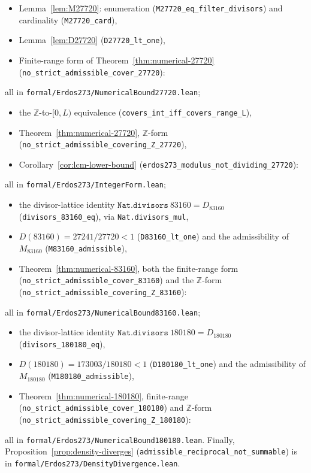 \documentclass[11pt,a4paper]{article}
\theoremstyle{plain}
\theoremstyle{definition}
\theoremstyle{remark}
\begin{document}
\begin{sloppypar}
\begin{itemize}
  \item Lemma~\ref{lem:M27720}: enumeration
        (\texttt{M27720\_eq\_filter\_divisors}) and
        cardinality (\texttt{M27720\_card}),
  \item Lemma~\ref{lem:D27720}
        (\texttt{D27720\_lt\_one}),
  \item Finite-range form of Theorem~\ref{thm:numerical-27720}
        (\texttt{no\_strict\_admissible\_cover\_27720}):
\end{itemize}
all in \texttt{formal/Erdos273/NumericalBound27720.lean};
\begin{itemize}
  \item the $\mathbb{Z}$-to-$[0, L)$ equivalence
        (\texttt{covers\_int\_iff\_covers\_range\_L}),
  \item Theorem~\ref{thm:numerical-27720}, $\mathbb{Z}$-form
        (\texttt{no\_strict\_admissible\_covering\_Z\_27720}),
  \item Corollary~\ref{cor:lcm-lower-bound}
        (\texttt{erdos273\_modulus\_not\_dividing\_27720}):
\end{itemize}
all in \texttt{formal/Erdos273/IntegerForm.lean};
\begin{itemize}
  \item the divisor-lattice identity
        $\texttt{Nat.divisors}\ 83160 = D_{83160}$
        (\texttt{divisors\_83160\_eq}), via \texttt{Nat.divisors\_mul},
  \item $D(83160) = 27241/27720 < 1$ (\texttt{D83160\_lt\_one}) and the
        admissibility of $M_{83160}$ (\texttt{M83160\_admissible}),
  \item Theorem~\ref{thm:numerical-83160}, both the finite-range form
        (\texttt{no\_strict\_admissible\_cover\_83160}) and the
        $\mathbb{Z}$-form
        (\texttt{no\_strict\_admissible\_covering\_Z\_83160}):
\end{itemize}
all in \texttt{formal/Erdos273/NumericalBound83160.lean};
\begin{itemize}
  \item the divisor-lattice identity
        $\texttt{Nat.divisors}\ 180180 = D_{180180}$
        (\texttt{divisors\_180180\_eq}),
  \item $D(180180) = 173003/180180 < 1$ (\texttt{D180180\_lt\_one})
        and the admissibility of $M_{180180}$
        (\texttt{M180180\_admissible}),
  \item Theorem~\ref{thm:numerical-180180}, finite-range
        (\texttt{no\_strict\_admissible\_cover\_180180}) and
        $\mathbb{Z}$-form
        (\texttt{no\_strict\_admissible\_covering\_Z\_180180}):
\end{itemize}
all in \texttt{formal/Erdos273/NumericalBound180180.lean}. Finally,
Proposition~\ref{prop:density-diverges} (\texttt{admissible\_reciprocal\_not\_summable})
is in \texttt{formal/Erdos273/DensityDivergence.lean}.
\end{sloppypar}
\end{document}
